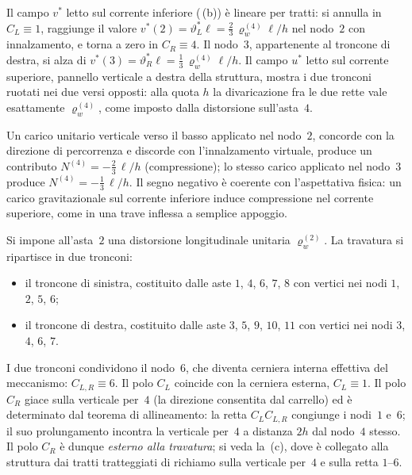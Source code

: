 \begin{esempio}
\begin{svolgimento}
		Il campo $v^*$ letto sul corrente inferiore
		(\,(b)) è lineare per tratti:
		si annulla in $C_L\equiv 1$, raggiunge il valore
		$v^*(2)=\vartheta_L^*\ell=\tfrac{2}{3}\,\varrho_w^{(4)}\ell/h$
		nel nodo~$2$ con innalzamento, e torna a zero in $C_R\equiv 4$.
		Il nodo~$3$, appartenente al troncone di destra, si alza di
		$v^*(3)=\vartheta_R^*\ell=\tfrac{1}{3}\,\varrho_w^{(4)}\ell/h$.
		Il campo $u^*$ letto sul corrente superiore, pannello verticale
		a destra della struttura, mostra i due tronconi ruotati nei due
		versi opposti: alla quota $h$ la divaricazione fra le due rette
		vale esattamente $\varrho_w^{(4)}$, come imposto dalla distorsione
		sull'asta~$4$.
		
		Un carico unitario verticale verso il basso applicato nel nodo~$2$,
		concorde con la direzione di percorrenza e discorde con
		l'innalzamento virtuale, produce un contributo
		$N^{(4)}=-\tfrac{2}{3}\,\ell/h$ (compressione); lo stesso carico
		applicato nel nodo~$3$ produce $N^{(4)}=-\tfrac{1}{3}\,\ell/h$.
		Il segno negativo è coerente con l'aspettativa fisica: un carico
		gravitazionale sul corrente inferiore induce compressione nel
		corrente superiore, come in una trave inflessa a semplice appoggio.
		
		Si impone all'asta~$2$ una distorsione longitudinale unitaria
		$\varrho_w^{(2)}$. La travatura si ripartisce in due tronconi:
		\begin{itemize}[noitemsep,topsep=2pt]
			\item il troncone di sinistra, costituito dalle aste
			$1$, $4$, $6$, $7$, $8$ con vertici nei nodi $1$, $2$, $5$, $6$;
			\item il troncone di destra, costituito dalle aste
			$3$, $5$, $9$, $10$, $11$ con vertici nei nodi $3$, $4$, $6$, $7$.
		\end{itemize}
		I due tronconi condividono il nodo~$6$, che diventa cerniera
		interna effettiva del meccanismo: $C_{L,R}\equiv 6$. Il polo
		$C_L$ coincide con la cerniera esterna, $C_L\equiv 1$. Il polo
		$C_R$ giace sulla verticale per~$4$ (la direzione consentita
		dal carrello) ed è determinato dal teorema di allineamento: la
		retta $C_L C_{L,R}$ congiunge i nodi~$1$ e~$6$; il suo
		prolungamento incontra la verticale per~$4$ a distanza $2h$ dal
		nodo~$4$ stesso. Il polo $C_R$ è dunque \emph{esterno alla
			travatura}; si veda la \,(c), dove è
		collegato alla struttura dai tratti tratteggiati di richiamo
		sulla verticale per~$4$ e sulla retta $1$--$6$.
		

\end{svolgimento}
\end{esempio}
